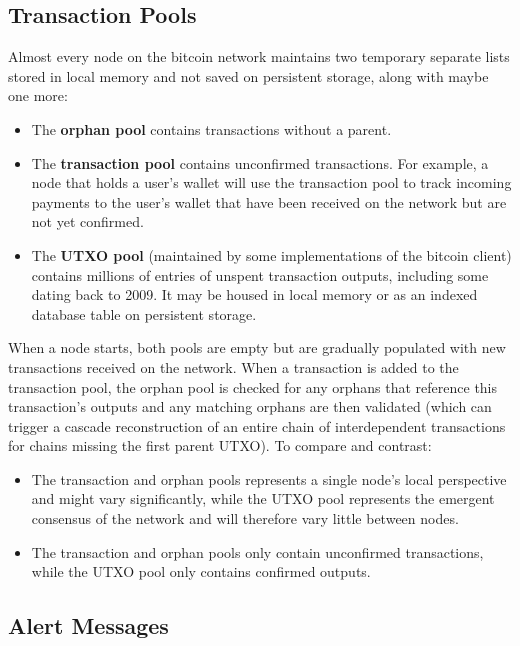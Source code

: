 \documentclass{article}
\begin{document}
  \subsection{Transaction Pools}

    Almost every node on the bitcoin network maintains two temporary separate lists stored in local memory and not saved on persistent storage, along with maybe one more:

    \begin{itemize}
      \item The \textbf{orphan pool} contains transactions without a parent.
      \item The \textbf{transaction pool} contains unconfirmed transactions. For example, a node that holds a user's wallet will use the transaction pool to track incoming payments to the user's wallet that have been received on the network but are not yet confirmed.
      \item The \textbf{UTXO pool} (maintained by some implementations of the bitcoin client) contains millions of entries of unspent transaction outputs, including some dating back to 2009. It may be housed in local memory or as an indexed database table on persistent storage.
    \end{itemize}

    When a node starts, both pools are empty but are gradually populated with new transactions received on the network. When a transaction is added to the transaction pool, the orphan pool is checked for any orphans that reference this transaction's outputs and any matching orphans are then validated (which can trigger a cascade reconstruction of an entire chain of interdependent transactions for chains missing the first parent UTXO). To compare and contrast:

    \begin{itemize}
      \item The transaction and orphan pools represents a single node's local perspective and might vary significantly, while the UTXO pool represents the emergent consensus of the network and will therefore vary little between nodes.
      \item The transaction and orphan pools only contain unconfirmed transactions, while the UTXO pool only contains confirmed outputs.
    \end{itemize}

  \subsection{Alert Messages}
\end{document}
